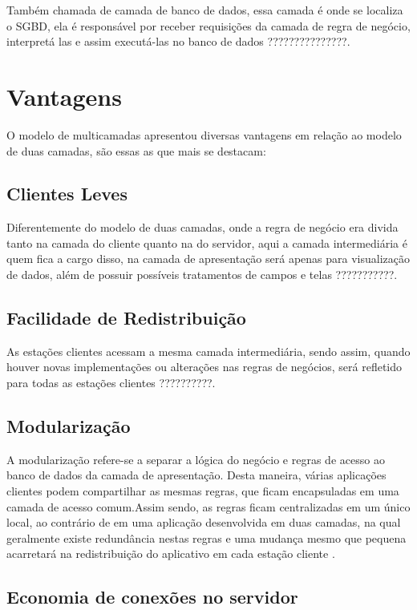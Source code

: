 Também chamada de camada de banco de dados, essa camada é onde se localiza o \ac{SGBD}, ela é responsável por receber requisições da camada de regra de negócio, interpretá las e assim executá-las no banco de dados ???????????????.


\section{Vantagens}

O modelo de multicamadas apresentou diversas vantagens em relação ao modelo de duas camadas, são essas as que mais se destacam:

\subsection{Clientes Leves}

Diferentemente do modelo de duas camadas, onde a regra de negócio era divida tanto na camada do cliente quanto na do servidor, aqui a camada intermediária é quem fica a cargo disso, na camada de apresentação será apenas para visualização de dados, além de possuir possíveis tratamentos de campos e telas ???????????.

\subsection{Facilidade de Redistribuição}

As estações clientes acessam a mesma camada intermediária, sendo assim, quando houver novas implementações ou alterações nas regras de negócios, será refletido para todas as estações clientes ??????????.

\subsection{Modularização}

A modularização refere-se a separar a lógica do negócio e regras de acesso ao banco de dados da camada de apresentação. Desta maneira, várias aplicações clientes podem compartilhar as mesmas regras, que ficam encapsuladas em uma camada de acesso comum.Assim sendo, as regras ficam centralizadas em um único local, ao contrário de em uma aplicação desenvolvida em duas camadas, na qual geralmente existe redundância nestas regras e uma mudança mesmo que pequena acarretará na redistribuição do aplicativo em cada estação cliente \cite{devmediaMultiCamada2018}.

\subsection{Economia de conexões no servidor}

